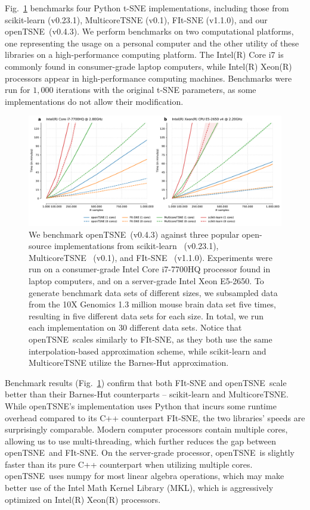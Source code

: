 \documentclass[twocolumn]{article}
\newcommand{\opentsne}{\textsf{openTSNE}}
\begin{document}
Fig.~\ref{fig:benchmarks} benchmarks four Python t-SNE implementations,
including those from \textsf{scikit-learn} (v0.23.1), \textsf{MulticoreTSNE}
(v0.1), \textsf{FIt-SNE} (v1.1.0), and our \opentsne\ (v0.4.3). We perform
benchmarks on two computational platforms, one representing the usage on a
personal computer and the other utility of these libraries on a high-performance
computing platform. The Intel(R) Core i7 is commonly found in consumer-grade
laptop computers, while Intel(R) Xeon(R) processors appear in high-performance
computing machines. Benchmarks were run for $1,000$ iterations with the original
t-SNE parameters, as some implementations do not allow their modification. 

\begin{figure}[htbp]
  \includegraphics[width=\textwidth]{benchmarks}
  \caption{\label{fig:benchmarks}
We benchmark \opentsne\ (v0.4.3) against three popular open-source implementations
	from \textsf{scikit-learn}~\cite{pedregosa2011scikit} (v0.23.1),
	\textsf{MulticoreTSNE}~\cite{Ulyanov2016} (v0.1), and
	\textsf{FIt-SNE}~\cite{linderman2019fast} (v1.1.0). Experiments were run on a
	consumer-grade Intel Core i7-7700HQ processor found in laptop computers,
	and on a server-grade Intel Xeon E5-2650. To generate benchmark data
	sets of different sizes, we subsampled data from the 10X Genomics 1.3
	million mouse brain data set five times, resulting in five different
	data sets for each size. In total, we run each implementation on 30
	different data sets. Notice that \opentsne\ scales similarly to \textsf{FIt-SNE},
	as they both use the same interpolation-based approximation scheme,
	while \textsf{scikit-learn} and \textsf{MulticoreTSNE} utilize the Barnes-Hut
	approximation.
}
\end{figure}

Benchmark results (Fig.~\ref{fig:benchmarks}) confirm that both \textsf{FIt-SNE}
and \opentsne\ scale better than their Barnes-Hut counterparts --
\textsf{scikit-learn} and \textsf{MulticoreTSNE}. While \opentsne's
implementation uses Python that incurs some runtime overhead compared to its C++
counterpart \textsf{FIt-SNE}, the two libraries' speeds are surprisingly
comparable. Modern computer processors contain multiple cores, allowing us to
use multi-threading, which further reduces the gap between \opentsne\ and
\textsf{FIt-SNE}. On the server-grade processor, \opentsne\ is slightly faster
than its pure C++ counterpart when utilizing multiple cores. \opentsne\ uses
\textsf{numpy} for most linear algebra operations, which may make better use of
the Intel Math Kernel Library (MKL), which is aggressively optimized on Intel(R)
Xeon(R) processors.  
\end{document}
